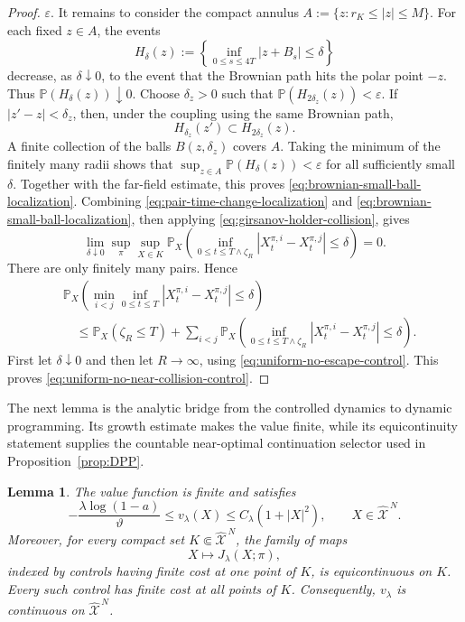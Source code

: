 \documentclass[11pt]{article}
\def\P{\mathbb{P}}
\def\Xc{{\mathcal X}}
\def\hX{\widehat{\Xc}^{\,N}}
\newtheorem{lemma}[theorem]{Lemma}
\theoremstyle{definition}
\theoremstyle{remark}
\numberwithin{equation}{section}
\begin{document}
\begin{proof}
$\varepsilon$.  It remains to consider the compact annulus
$A:=\{z:r_K\le|z|\le M\}$.  For each fixed $z\in A$, the events
\[
 H_\delta(z):=\left\{\inf_{0\le s\le4T}|z+B_s|\le\delta\right\}
\]
decrease, as $\delta\downarrow0$, to the event that the Brownian path hits the polar point $-z$.
Thus $\P(H_\delta(z))\downarrow0$.  Choose $\delta_z>0$ such that
$\P(H_{2\delta_z}(z))<\varepsilon$.  If $|z'-z|<\delta_z$, then, under the coupling using the same
Brownian path,
\[
 H_{\delta_z}(z')\subset H_{2\delta_z}(z).
\]
A finite collection of the balls $B(z,\delta_z)$ covers $A$.  Taking the minimum of the finitely
many radii shows that
$\sup_{z\in A}\P(H_\delta(z))<\varepsilon$ for all sufficiently small $\delta$.  Together with the
far-field estimate, this proves \eqref{eq:brownian-small-ball-localization}.
Combining \eqref{eq:pair-time-change-localization} and
\eqref{eq:brownian-small-ball-localization}, then applying
\eqref{eq:girsanov-holder-collision}, gives
\[
 \lim_{\delta\downarrow0}\sup_\pi\sup_{X\in K}
 \P_X\left(\inf_{0\le t\le T\wedge\zeta_R}
 |X_t^{\pi,i}-X_t^{\pi,j}|\le\delta\right)=0.
\]
There are only finitely many pairs.  Hence
\begin{align*}
 &\P_X\left(\min_{i<j}\inf_{0\le t\le T}
 |X_t^{\pi,i}-X_t^{\pi,j}|\le\delta\right)\\
 &\quad\le
 \P_X(\zeta_R\le T)
 +\sum_{i<j}\P_X\left(\inf_{0\le t\le T\wedge\zeta_R}
 |X_t^{\pi,i}-X_t^{\pi,j}|\le\delta\right).
\end{align*}
First let $\delta\downarrow0$ and then let $R\to\infty$, using
\eqref{eq:uniform-no-escape-control}.  This proves
\eqref{eq:uniform-no-near-collision-control}.
\end{proof}
The next lemma is the analytic bridge from the controlled dynamics to dynamic programming.  Its
growth estimate makes the value finite, while its equicontinuity statement supplies the countable
near-optimal continuation selector used in Proposition~\ref{prop:DPP}.
\begin{lemma}\label{lem:value-continuity}
The value function is finite and satisfies
\begin{equation}\label{eq:value-growth}
 -\frac{\lambda\log(1-a)}{\vartheta}
 \le v_\lambda(X)\le C_\lambda(1+|X|^2),
 \qquad X\in\hX.
\end{equation}
Moreover, for every compact set $K\Subset\hX$, the family of maps
\[
 X\longmapsto J_\lambda(X;\pi),
\]
indexed by controls having finite cost at one point of $K$, is equicontinuous on $K$.  Every such
control has finite cost at all points of $K$.  Consequently, $v_\lambda$ is continuous on $\hX$.
\end{lemma}
\end{document}
